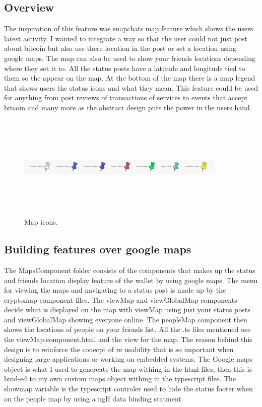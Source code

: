 \subsection{Overview}
The inspiration of this feature was snapchats map feature which shows the users latest activity. I wanted to integrate a way so that the user could not just post about bitcoin but also use there location in the post or set a location using google maps. The map can also be used to show your friends locations depending where they set it to. All the status posts have a latitude and longitude tied to them so the appear on the map. At the bottom of the map there is a map legend that shows users the status icons and what they mean. This feature could be used for anything from post reviews of transactions of services to events that accept bitcoin and many more as the abstract design puts the power in the users hand.

\begin{figure}[H]
\centering
\includegraphics[width=10cm, height=5cm]{img/mapfooter.png}
\caption{Map icons.}
\end{figure}

\subsection{Building features over google maps}
The MapsComponent folder consists of the components that makes up the status and friends location display feature of the wallet by using google maps. The menu for viewing the maps and navigating to a status post is made up by the cryptomap component files. The viewMap and viewGlobalMap components decide what is displayed on the map with viewMap using just your status posts and viewGlobalMap showing everyone online. The peopleMap component then shows the locations of people on your friends list. All the .ts files mentioned use the viewMap.component.html and the view for the map. The reason behind this design is to reinforce the conecpt of re usability that is so important when designing large applications or working on embedded systems. The Google maps object is what I used to genereate the map withing in the html files, then this is bind-ed to my own custom maps object withing in the typescript files. The showmap variable is the typescript controler used to hide the status footer when on the people map by using a ngIf data binding statment.

